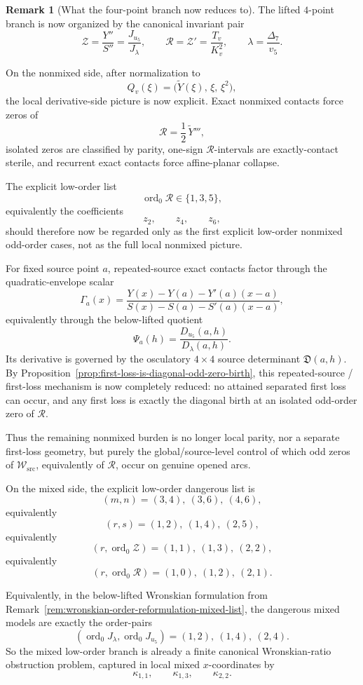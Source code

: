 \documentclass[11pt,a4paper]{amsart}
\theoremstyle{plain}
\theoremstyle{definition}
\newtheorem{remark}[theorem]{Remark}
\begin{document}
\begin{remark}[What the four-point branch now reduces to]
\label{rem:next-algebraic-target-four-point}
The lifted $4$-point branch is now organized by the canonical invariant pair
\[
\mathcal Z=\frac{Y''}{S''}=\frac{J_{u_5}}{J_\lambda},
\qquad
\mathcal R=\mathcal Z'=\frac{T_v}{K_v^2},
\qquad
\lambda=\frac{\Delta_7}{v_5}.
\]

On the nonmixed side, after normalization to
\[
Q_v(\xi)=\bigl(\widetilde Y(\xi),\,\xi,\,\xi^2\bigr),
\]
the local derivative-side picture is now explicit. Exact nonmixed contacts force
zeros of
\[
\mathcal R=\frac12\,\widetilde Y''',
\]
isolated zeros are classified by parity, one-sign $\mathcal R$-intervals are
exactly-contact sterile, and recurrent exact contacts force affine-planar
collapse.

The explicit low-order list
\[
\operatorname{ord}_0\mathcal R\in\{1,3,5\},
\]
equivalently the coefficients
\[
z_2,\qquad z_4,\qquad z_6,
\]
should therefore now be regarded only as the first explicit low-order nonmixed
odd-order cases, not as the full local nonmixed picture.

For fixed source point $a$, repeated-source exact contacts factor through the
quadratic-envelope scalar
\[
\Gamma_a(x)=
\frac{Y(x)-Y(a)-Y'(a)(x-a)}
{S(x)-S(a)-S'(a)(x-a)},
\]
equivalently through the below-lifted quotient
\[
\Psi_a(h)=\frac{D_{u_5}(a,h)}{D_\lambda(a,h)}.
\]
Its derivative is governed by the osculatory $4\times 4$ source determinant
$\mathfrak D(a,h)$. By
Proposition~\ref{prop:first-loss-is-diagonal-odd-zero-birth}, this
repeated-source / first-loss mechanism is now completely reduced: no attained
separated first loss can occur, and any first loss is exactly the diagonal
birth at an isolated odd-order zero of $\mathcal R$.

Thus the remaining nonmixed burden is no longer local parity, nor a separate
first-loss geometry, but purely the global/source-level control of which odd
zeros of $\mathcal W_{\mathrm{src}}$, equivalently of $\mathcal R$, occur
on genuine opened arcs.

On the mixed side, the explicit low-order dangerous list is
\[
(m,n)=(3,4),\ (3,6),\ (4,6),
\]
equivalently
\[
(r,s)=(1,2),\ (1,4),\ (2,5),
\]
equivalently
\[
(r,\operatorname{ord}_0\mathcal Z)=(1,1),\ (1,3),\ (2,2),
\]
equivalently
\[
(r,\operatorname{ord}_0\mathcal R)=(1,0),\ (1,2),\ (2,1).
\]

\noindent
Equivalently, in the below-lifted Wronskian formulation from
Remark~\ref{rem:wronskian-order-reformulation-mixed-list}, the dangerous mixed
models are exactly the order-pairs
\[
(\operatorname{ord}_0J_\lambda,\operatorname{ord}_0J_{u_5})
=(1,2),\ (1,4),\ (2,4).
\]
So the mixed low-order branch is already a finite canonical
Wronskian-ratio obstruction problem, captured in local mixed $x$-coordinates by
\[
\kappa_{1,1},\qquad \kappa_{1,3},\qquad \kappa_{2,2}.
\]


\end{remark}
\end{document}
